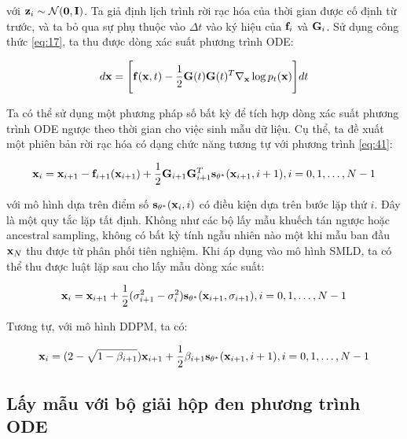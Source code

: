 \documentclass{article} %
\begin{document}
với $\bold{z}_i \sim \mathcal{N}(\bold{0}, \bold{I})$.
Ta giả định lịch trình rời rạc hóa của thời gian được cố định từ trước,
và ta bỏ qua sự phụ thuộc vào $\Delta t$ vào ký hiệu của $\bold{f}_i$ và $\bold{G}_i$.
Sử dụng công thức \ref{eq:17}, ta thu được dòng xác suất phương trình ODE:

\begin{equation} \label{eq:42}
    d \bold{x} = \Bigg \lbrack \bold{f}(\bold{x}, t) - \dfrac{1}{2} \bold{G}(t) \bold{G}(t)^T \nabla_{\bold{x}} \log p_t (\bold{x}) \Bigg \rbrack dt
\end{equation}

Ta có thể sử dụng một phương pháp số bất kỳ để tích hợp dòng xác suất phương trình ODE ngược theo thời gian cho việc sinh mẫu dữ liệu.
Cụ thể, ta đề xuất một phiên bản rời rạc hóa có dạng chức năng tương tự với phương trình \ref{eq:41}:

\begin{equation*}
    \bold{x}_i = \bold{x}_{i+1} - \bold{f}_{i+1}(\bold{x}_{i+1}) + \dfrac{1}{2} \bold{G}_{i+1} \bold{G}_{i+1}^T \bold{s}_{\bold{\theta}^{\ast}} (\bold{x}_{i+1}, i+1), i = 0, 1, \dots, N - 1
\end{equation*}

với mô hình dựa trên điểm số $\bold{s}_{\bold{\theta}^{\ast}}(\bold{x}_i, i)$ có điều kiện dựa trên bước lặp thứ $i$.
Đây là một quy tắc lặp tất định.
Không như các bộ lấy mẫu khuếch tán ngược hoặc ancestral sampling, không có bất kỳ tính ngẫu nhiên nào một khi mẫu ban đầu $\bold{x}_N$ thu được từ phân phối tiên nghiệm.
Khi áp dụng vào mô hình SMLD, ta có thể thu được luật lặp sau cho lấy mẫu dòng xác suất:

\begin{equation} \label{eq:43}
    \bold{x}_i = \bold{x}_{i+1} + \dfrac{1}{2} (\sigma_{i+1}^2 - \sigma_i^2) \bold{s}_{\bold{\theta}^{\ast}} (\bold{x}_{i+1}, \sigma_{i+1}), i = 0, 1, \dots, N - 1
\end{equation}

Tương tự, với mô hình DDPM, ta có:

\begin{equation} \label{eq:44}
    \bold{x}_i = (2 - \sqrt{1 - \beta_{i+1}}) \bold{x}_{i+1} + \dfrac{1}{2} \beta_{i+1} \bold{s}_{\bold{\theta}^{\ast}} (\bold{x}_{i+1}, i + 1), i = 0, 1, \dots, N - 1
\end{equation}

\subsection{Lấy mẫu với bộ giải hộp đen phương trình ODE} \label{D.4}
\end{document}
